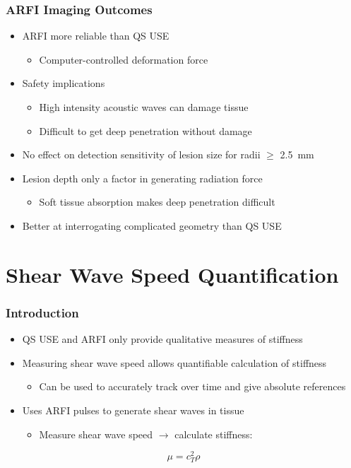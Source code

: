 \documentclass{beamer}
\begin{document}
		\begin{frame}
			\frametitle{ARFI Imaging Outcomes}
			\begin{itemize}
				\item ARFI more reliable than QS USE
				\begin{itemize}
					\item Computer-controlled deformation force
				\end{itemize}
				\item Safety implications
				\begin{itemize}
					\item High intensity acoustic waves can damage tissue
					\item Difficult to get deep penetration without damage
				\end{itemize}
				\item No effect on detection sensitivity of lesion size for radii $\geq$ \SI{2.5}{\mm}
				\item Lesion depth only a factor in generating radiation force
				\begin{itemize}
					\item Soft tissue absorption makes deep penetration difficult
				\end{itemize}
				\item Better at interrogating complicated geometry than QS USE
			\end{itemize}
		\end{frame}

	\section[Shear]{Shear Wave Speed Quantification}
		\begin{frame}
			\frametitle{Introduction}
			\begin{itemize}
				\item QS USE and ARFI only provide \alert{qualitative} measures of stiffness
				\item Measuring shear wave speed allows quantifiable calculation of stiffness
				\begin{itemize}
					\item Can be used to accurately track over time and give absolute references
				\end{itemize}
				\item Uses ARFI pulses to generate shear waves in tissue
				\begin{itemize}
					\item Measure shear wave speed $\rightarrow$ calculate stiffness:
				\end{itemize}
			\end{itemize}
			\begin{equation*}
				\mu = c_T^2 \rho
			\end{equation*}
		\end{frame}
\end{document}
